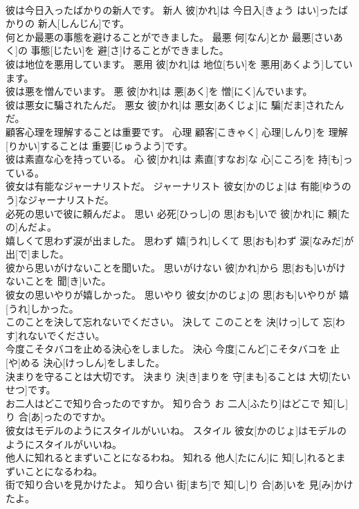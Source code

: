 \documentclass[8pt]{extreport}
\begin{document}
\begin{CJK}{UTF8}{min}
\\	彼は今日入ったばかりの新人です。	新人	彼[かれ]は 今日入[きょう はい]ったばかりの 新人[しんじん]です。	
\\	何とか最悪の事態を避けることができました。	最悪	何[なん]とか 最悪[さいあく]の 事態[じたい]を 避[さ]けることができました。	
\\	彼は地位を悪用しています。	悪用	彼[かれ]は 地位[ちい]を 悪用[あくよう]しています。	
\\	彼は悪を憎んでいます。	悪	彼[かれ]は 悪[あく]を 憎[にく]んでいます。	
\\	彼は悪女に騙されたんだ。	悪女	彼[かれ]は 悪女[あくじょ]に 騙[だま]されたんだ。	
\\	顧客心理を理解することは重要です。	心理	顧客[こきゃく] 心理[しんり]を 理解[りかい]することは 重要[じゅうよう]です。	
\\	彼は素直な心を持っている。	心	彼[かれ]は 素直[すなお]な 心[こころ]を 持[も]っている。	
\\	彼女は有能なジャーナリストだ。	ジャーナリスト	彼女[かのじょ]は 有能[ゆうのう]なジャーナリストだ。	
\\	必死の思いで彼に頼んだよ。	思い	必死[ひっし]の 思[おも]いで 彼[かれ]に 頼[たの]んだよ。	
\\	嬉しくて思わず涙が出ました。	思わず	嬉[うれ]しくて 思[おも]わず 涙[なみだ]が 出[で]ました。	
\\	彼から思いがけないことを聞いた。	思いがけない	彼[かれ]から 思[おも]いがけないことを 聞[き]いた。	
\\	彼女の思いやりが嬉しかった。	思いやり	彼女[かのじょ]の 思[おも]いやりが 嬉[うれ]しかった。	
\\	このことを決して忘れないでください。	決して	このことを 決[けっ]して 忘[わす]れないでください。	
\\	今度こそタバコを止める決心をしました。	決心	今度[こんど]こそタバコを 止[や]める 決心[けっしん]をしました。	
\\	決まりを守ることは大切です。	決まり	決[き]まりを 守[まも]ることは 大切[たいせつ]です。	
\\	お二人はどこで知り合ったのですか。	知り合う	お 二人[ふたり]はどこで 知[し]り 合[あ]ったのですか。	
\\	彼女はモデルのようにスタイルがいいね。	スタイル	彼女[かのじょ]はモデルのようにスタイルがいいね。	
\\	他人に知れるとまずいことになるわね。	知れる	他人[たにん]に 知[し]れるとまずいことになるわね。	
\\	街で知り合いを見かけたよ。	知り合い	街[まち]で 知[し]り 合[あ]いを 見[み]かけたよ。	

\end{CJK}
\end{document}
